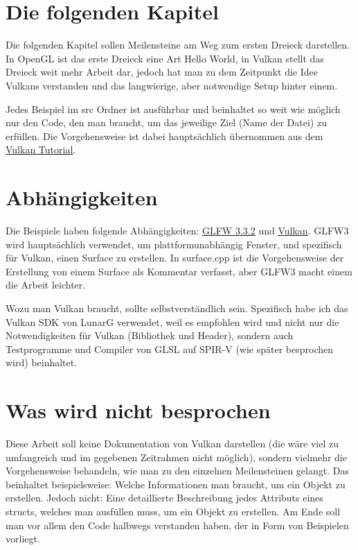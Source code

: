 \documentclass[11pt,a4paper]{report}
\begin{document}
\section{Die folgenden Kapitel}
Die folgenden Kapitel sollen Meilensteine am Weg zum ersten Dreieck darstellen. In OpenGL ist das erste Dreieck eine Art Hello World, in Vulkan stellt das Dreieck weit mehr Arbeit dar, jedoch hat man zu dem Zeitpunkt die Idee Vulkans verstanden und das langwierige, aber notwendige Setup hinter einem.

Jedes Beispiel im src Ordner ist ausführbar und beinhaltet so weit wie möglich nur den Code, den man braucht, um das jeweilige Ziel (Name der Datei) zu erfüllen. Die Vorgehensweise ist dabei hauptsächlich übernommen aus dem \href{https://vulkan-tutorial.com}{Vulkan Tutorial}.

\section{Abhängigkeiten}
Die Beispiele haben folgende Abhängigkeiten: \href{https://www.glfw.org/download.html}{GLFW 3.3.2} und \href{https://vulkan.lunarg.com}{Vulkan}. GLFW3 wird hauptsächlich verwendet, um plattformunabhängig Fenster, und spezifisch für Vulkan, einen Surface zu erstellen. In surface.cpp ist die Vorgehensweise der Erstellung von einem Surface als Kommentar verfasst, aber GLFW3 macht einem die Arbeit leichter.

Wozu man Vulkan braucht, sollte selbstverständlich sein. Spezifisch habe ich das Vulkan SDK von LunarG verwendet, weil es empfohlen wird und nicht nur die Notwendigkeiten für Vulkan (Bibliothek und Header), sondern auch Testprogramme und Compiler von GLSL auf SPIR-V (wie später besprochen wird) beinhaltet.

\section{Was wird nicht besprochen}
Diese Arbeit soll keine Dokumentation von Vulkan darstellen (die wäre viel zu umfangreich und im gegebenen Zeitrahmen nicht möglich), sondern vielmehr die Vorgehensweise behandeln, wie man zu den einzelnen Meilensteinen gelangt. Das beinhaltet beispielsweise: Welche Informationen man braucht, um ein Objekt zu erstellen. Jedoch nicht: Eine detaillierte Beschreibung jedes Attributs eines structs, welches man ausfüllen muss, um ein Objekt zu erstellen. Am Ende soll man vor allem den Code halbwegs verstanden haben, der in Form von Beispielen vorliegt.
\end{document}
